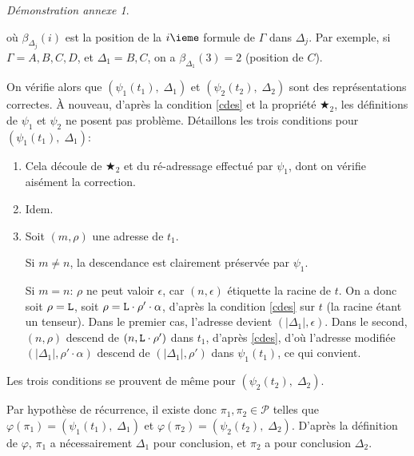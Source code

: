 \documentclass[11pt,a4paper]{article}
\theoremstyle{plain}
\theoremstyle{definition}
\theoremstyle{remark}
\newtheorem{demonstrationappendix}{Démonstration annexe}
\newcommand*{\someadd}{\rho}
\newcommand*{\sequent}{\Gamma}
\newcommand*{\sequentbis}{\Delta}
\newcommand*{\Left}{\textnormal{\texttt{L}}}
\newcommand*{\proofs}{\ensuremath{\mathcal{P}}}
\newcommand*{\encode}{\ensuremath{\varphi}}
\begin{document}
\begin{demonstrationappendix}
\begin{description}
        où $\beta_{\sequentbis_j} \left( i \right)$ est la position de la $i\ieme$ formule de $\sequent$ dans $\sequentbis_j$. Par exemple, si $\sequent = A, B, C, D$, et $\sequentbis_1 = B, C$, on a $\beta_{\sequentbis_1} \left( 3 \right) = 2$ (position de $C$).
    
        On vérifie alors que $\left( \psi_1 \left( t_1 \right), \; \sequentbis_1 \right)$ et $\left( \psi_2 \left( t_2 \right), \; \sequentbis_2 \right)$ sont des représentations correctes. À nouveau, d'après la condition \ref{cdes} et la propriété $\bigstar_2$, les définitions de $\psi_1$ et $\psi_2$ ne posent pas problème. Détaillons les trois conditions pour $\left( \psi_1 \left( t_1 \right), \; \sequentbis_1 \right)$:
    
        \begin{enumerate}
            \item Cela découle de $\bigstar_2$ et du ré-adressage effectué par $\psi_1$, dont on vérifie aisément la correction.
            
            \item Idem.
    
            \item Soit $(m, \someadd)$ une adresse de $t_1$.
            
            Si $m \neq n$, la descendance est clairement préservée par $\psi_1$.
            
            Si $m = n$: $\someadd$ ne peut valoir $\epsilon$, car $(n, \epsilon)$ étiquette la racine de $t$. On a donc soit $\someadd = \Left$, soit $\someadd = \Left \cdot \someadd' \cdot \alpha$, d'après la condition \ref{cdes} sur $t$ (la racine étant un tenseur). Dans le premier cas, l'adresse devient $(| \sequentbis_1 |, \epsilon)$. Dans le second, $(n, \someadd)$ descend de $(n, \Left \cdot \someadd' )$ dans $t_1$, d'après \ref{cdes}, d'où l'adresse modifiée $(| \sequentbis_1 |, \someadd' \cdot \alpha)$ descend de $(| \sequentbis_1 |, \someadd')$ dans $\psi_1 \left( t_1 \right)$, ce qui convient.
        \end{enumerate}
    
        Les trois conditions se prouvent de même pour $\left( \psi_2 \left( t_2 \right), \; \sequentbis_2 \right)$.
    
        Par hypothèse de récurrence, il existe donc $\pi_1, \pi_2 \in \proofs$ telles que $\encode \left( \pi_1 \right) = \left( \psi_1 \left( t_1 \right), \; \sequentbis_1 \right)$ et $\encode \left( \pi_2 \right) = \left( \psi_2 \left( t_2 \right), \; \sequentbis_2 \right)$. D'après la définition de $\encode$, $\pi_1$ a nécessairement $\sequentbis_1$ pour conclusion, et $\pi_2$ a pour conclusion $\sequentbis_2$.
        

\end{description}
\end{demonstrationappendix}
\end{document}
